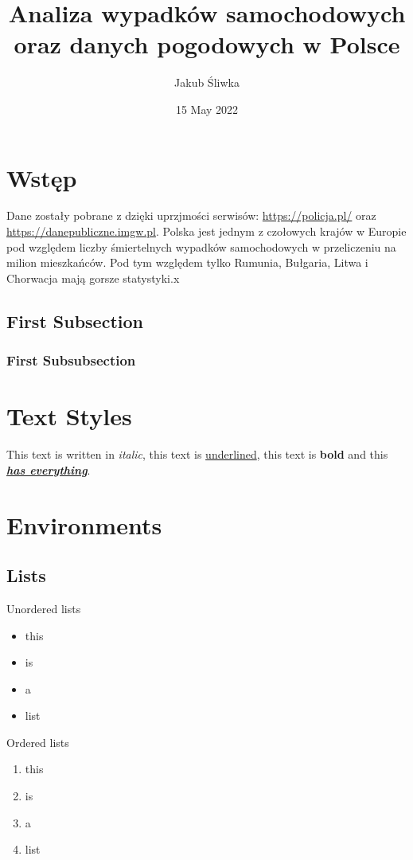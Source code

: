\documentclass{article}
\title{Analiza wypadków samochodowych oraz danych pogodowych w Polsce}
\author{Jakub Śliwka}
\date{15 May 2022}
\begin{document}
\maketitle

\section{Wstęp}
Dane zostały pobrane z dzięki uprzjmości serwisów: \url{https://policja.pl/} oraz \url{https://danepubliczne.imgw.pl}.
Polska jest jednym z czołowych krajów w Europie pod względem liczby śmiertelnych wypadków samochodowych w przeliczeniu na milion mieszkańców.
Pod tym względem tylko Rumunia, Bułgaria, Litwa i Chorwacja mają gorsze statystyki.x



\subsection{First Subsection}
\subsubsection{First Subsubsection}

\section{Text Styles}
This text is written in \textit{italic}, this text is \underline{underlined}, this text is \textbf{bold} and this \textbf{\textit{\underline{has everything}}}.

\section{Environments}
\subsection{Lists}
Unordered lists
\begin{itemize}
    \item this
    \item is
    \item a 
    \item list
\end{itemize}
Ordered lists
\begin{enumerate}
    \item this
    \item is
    \item a 
    \item list
\end{enumerate}
\end{document}
